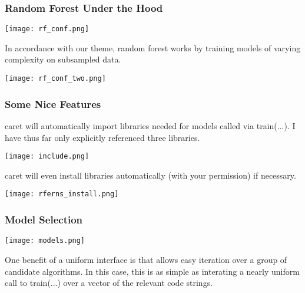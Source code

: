 \documentclass[presentation]{beamer}
\begin{document}
\begin{frame}
\frametitle{Random Forest Under the Hood}

\texttt{[image: rf\_conf.png]}

\vspace{5mm}

In accordance with our theme, random forest works by training models of varying complexity on subsampled data.  
\end{frame}


\begin{frame}

\begin{center}
\texttt{[image: rf\_conf\_two.png]}
\end{center}

\end{frame}


\begin{frame}
\frametitle{Some Nice Features}

caret will automatically import libraries needed for models called via train(...).  I have thus far only explicitly referenced three libraries.

\begin{center}
\texttt{[image: include.png]}
\end{center}

caret will even install libraries automatically (with your permission) if necessary.

\begin{center}
\texttt{[image: rferns\_install.png]}
\end{center}

\end{frame}


\begin{frame}
\frametitle{Model Selection}

\begin{center}
\texttt{[image: models.png]}
\end{center}

One benefit of a uniform interface is that allows easy iteration over a group of candidate algorithms.  In this case, this is as simple as interating a nearly uniform call to train(...) over a vector of the relevant code strings.

\end{frame}
\end{document}
